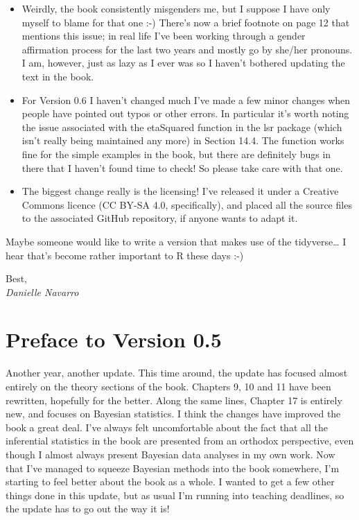 \documentclass[
]{book}
\providecommand{\tightlist}{%
  \setlength{\itemsep}{0pt}\setlength{\parskip}{0pt}}
\begin{document}
\begin{itemize}
\tightlist
\item
  Weirdly, the book consistently misgenders me, but I suppose I have
  only myself to blame for that one :-) There's now a brief footnote
  on page 12 that mentions this issue; in real life I've been working
  through a gender affirmation process for the last two years and
  mostly go by she/her pronouns. I am, however, just as lazy as I ever
  was so I haven't bothered updating the text in the book.
\item
  For Version 0.6 I haven't changed much I've made a few minor changes
  when people have pointed out typos or other errors. In particular
  it's worth noting the issue associated with the etaSquared function
  in the lsr package (which isn't really being maintained any more) in
  Section 14.4. The function works fine for the simple examples in the
  book, but there are definitely bugs in there that I haven't found
  time to check! So please take care with that one.
\item
  The biggest change really is the licensing! I've released it under a
  Creative Commons licence (CC BY-SA 4.0, specifically), and placed
  all the source files to the associated GitHub repository, if anyone
  wants to adapt it.
\end{itemize}

Maybe someone would like to write a version that makes use of the
tidyverse\ldots{} I hear that's become rather important to R these days :-)

Best,\\
\emph{Danielle Navarro}

\hypertarget{preface-to-version-0.5}{%
\section*{Preface to Version 0.5}\label{preface-to-version-0.5}}

Another year, another update. This time around, the update has focused
almost entirely on the theory sections of the book. Chapters 9, 10 and
11 have been rewritten, hopefully for the better. Along the same lines,
Chapter 17 is entirely new, and focuses on Bayesian statistics. I think
the changes have improved the book a great deal. I've always felt
uncomfortable about the fact that all the inferential statistics in the
book are presented from an orthodox perspective, even though I almost
always present Bayesian data analyses in my own work. Now that I've
managed to squeeze Bayesian methods into the book somewhere, I'm
starting to feel better about the book as a whole. I wanted to get a few
other things done in this update, but as usual I'm running into teaching
deadlines, so the update has to go out the way it is!
\end{document}
